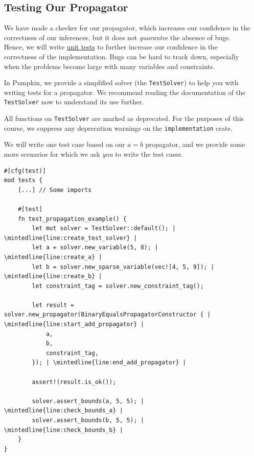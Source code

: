 \documentclass{article}
\begin{document}
\subsection{Testing Our Propagator}
        We have made a checker for our propagator, which increases our confidence in the correctness of our inferences, but it does not \textit{guarantee} the absence of bugs.
        Hence, we will write \href{https://doc.rust-lang.org/book/ch11-00-testing.html}{unit tests} to further increase our confidence in the correctness of the implementation.
        Bugs can be hard to track down, especially when the problems become large with many variables and constraints.

        In Pumpkin, we provide a simplified solver (the \texttt{TestSolver}) to help you with writing tests for a propagator.
        We recommend reading the documentation of the \texttt{TestSolver} now to understand its use further.

        \begin{Note}
            All functions on \texttt{TestSolver} are marked as deprecated.
            For the purposes of this course, we suppress any deprecation warnings on the \texttt{implementation} crate.
        \end{Note}

        We will write one test case based on our $a = b$ propagator, and we provide some more scenarios for which we ask \textit{you} to write the test cases.

        \begin{listing}[H]
            \begin{verbatim}
#[cfg(test)] 
mod tests {
    [...] // Some imports

    #[test]
    fn test_propagation_example() {
        let mut solver = TestSolver::default(); | \mintedline{line:create_test_solver} |
        let a = solver.new_variable(5, 8); | \mintedline{line:create_a} |
        let b = solver.new_sparse_variable(vec![4, 5, 9]); | \mintedline{line:create_b} |
        let constraint_tag = solver.new_constraint_tag();

        let result = solver.new_propagator(BinaryEqualsPropagatorConstructor { | \mintedline{line:start_add_propagator} |
            a,
            b,
            constraint_tag,
        }); | \mintedline{line:end_add_propagator} |

        assert!(result.is_ok());

        solver.assert_bounds(a, 5, 5); | \mintedline{line:check_bounds_a} |
        solver.assert_bounds(b, 5, 5); | \mintedline{line:check_bounds_b} |
    }
}
            \end{verbatim}
            \caption{Testing Our \texttt{Propagator} implementation}
            \label{lst:test_impl}
        \end{listing}
\end{document}
